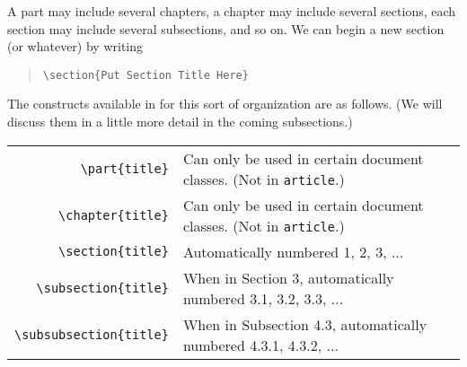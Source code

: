 \documentclass[letterpaper,twoside,10pt]{article}
\begin{document}
A part may include several chapters, a chapter may include several sections, each section may include several subsections, and so on. We can begin a new section (or whatever) by writing

\begin{quote}
 \verb!\section{Put Section Title Here}!
\end{quote}

\newpage
The constructs available in {\LaTeXe} for this sort of organization are as follows. (We will discuss them in a little more detail in the coming subsections.)

\begin{center}
 \begin{tabular}{rl}
  \small\verb!\part{title}! & \small Can only be used in certain document classes. (Not in \texttt{article}.)\\
  \small\verb!\chapter{title}! & \small Can only be used in certain document classes. (Not in \texttt{article}.)\\
  \small\verb!\section{title}! & \small Automatically numbered 1, 2, 3, ...\\
  \small\verb!\subsection{title}! & \small When in Section 3, automatically numbered 3.1, 3.2, 3.3, ...\\
  \small\verb!\subsubsection{title}! & \small When in Subsection 4.3, automatically numbered 4.3.1, 4.3.2, ...\\
 \end{tabular}
\end{center}
\end{document}
